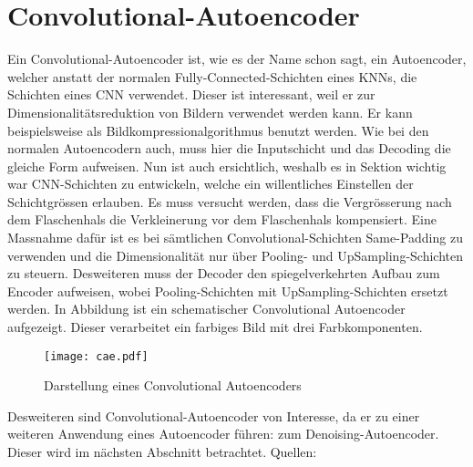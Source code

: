 \section{Convolutional-Autoencoder}\label{sec:convolutional_autoencoder}
Ein Convolutional-Autoencoder ist, wie es der Name schon sagt, ein Autoencoder,
welcher anstatt der normalen Fully-Connected-Schichten eines KNNs, die Schichten eines CNN verwendet.
Dieser ist interessant, weil er zur Dimensionalitätsreduktion von Bildern
verwendet werden kann. Er kann beispielsweise als Bildkompressionalgorithmus
benutzt werden.
\para{}
Wie bei den normalen Autoencodern auch, muss hier die Inputschicht und das
Decoding die gleiche Form aufweisen. Nun ist auch ersichtlich, weshalb es in
Sektion  wichtig war CNN-Schichten zu
entwickeln, welche ein willentliches Einstellen der Schichtgrössen erlauben.
Es muss versucht werden, dass die Vergrösserung nach dem Flaschenhals die
Verkleinerung vor dem Flaschenhals kompensiert.
Eine Massnahme dafür ist es bei sämtlichen Convolutional-Schichten Same-Padding zu
verwenden und die Dimensionalität nur über Pooling- und UpSampling-Schichten zu
steuern. Desweiteren muss der Decoder den spiegelverkehrten Aufbau zum Encoder
aufweisen, wobei Pooling-Schichten mit UpSampling-Schichten ersetzt werden.
\para{}
In Abbildung  ist ein schematischer
Convolutional Autoencoder aufgezeigt. Dieser verarbeitet ein farbiges Bild mit
drei Farbkomponenten.
\para{}
\begin{figure}[h!]
  \centering
  \texttt{[image: cae.pdf]}
  \caption{Darstellung eines Convolutional Autoencoders}
  \label{fig:convolutional_autoencoder}
\end{figure}
\para{}
Desweiteren sind Convolutional-Autoencoder von Interesse, da er zu einer weiteren
Anwendung eines Autoencoder führen: zum Denoising-Autoencoder.
Dieser wird im nächsten Abschnitt betrachtet.
\para{}
Quellen: \cite{yt:autoencoder_faces}

